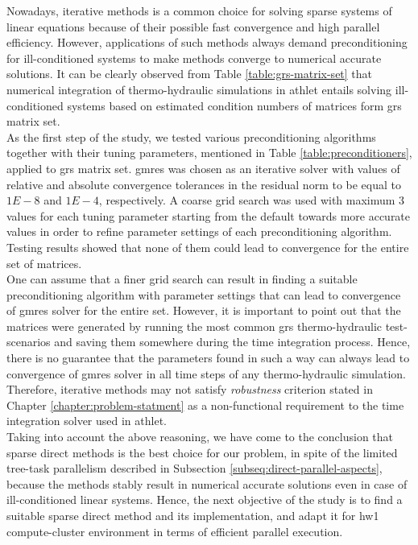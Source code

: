 \label{subseq:hybrid-method-description}

Nowadays, iterative methods is a common choice for solving sparse systems of linear equations because of their possible fast convergence and high parallel efficiency. However,  applications of such methods always demand preconditioning for ill-conditioned systems to make methods converge to numerical accurate solutions. It can be clearly observed from Table \ref{table:grs-matrix-set} that numerical integration of thermo-hydraulic simulations in \acrshort{athlet} entails solving ill-conditioned systems  based on estimated condition numbers of matrices form \acrshort{grs} matrix set.\\


As the first step of the study, we tested various preconditioning algorithms together with their tuning parameters, mentioned in Table \ref{table:preconditioners}, applied to \acrshort{grs} matrix set. \acrshort{gmres} was chosen as an iterative solver with values of relative and absolute convergence tolerances in the residual norm to be equal to $1E-8$ and $1E-4$, respectively. A coarse grid search was used with maximum 3 values for each tuning parameter starting from the default towards more accurate values in order to refine parameter settings of each preconditioning algorithm. Testing results showed that none of them could lead to convergence for the entire set of matrices.\\


One can assume that a finer grid search can result in finding a suitable preconditioning algorithm with parameter  settings that can lead to convergence of \acrshort{gmres} solver for the entire set. However, it is important to point out that the matrices were generated by running the most common \acrshort{grs} thermo-hydraulic test-scenarios and saving them somewhere during the time integration process. Hence, there is no guarantee that the parameters found in such a way can always lead to convergence of \acrshort{gmres} solver in all time steps of any thermo-hydraulic simulation. Therefore, iterative methods may not satisfy \textit{robustness} criterion  stated in Chapter \ref{chapter:problem-statment} as a non-functional requirement to the time integration solver used in \acrshort{athlet}.\\


Taking into account the above reasoning, we have come to the conclusion that sparse direct methods is the best choice for our problem, in spite of the limited tree-task parallelism described in Subsection \ref{subseq:direct-parallel-aspects}, because the methods stably result in numerical accurate solutions even in case of ill-conditioned linear systems. Hence, the next objective of the study is to find a suitable sparse direct method and its implementation, and adapt it for \gls{hw1} compute-cluster environment in terms of efficient parallel execution. \\
